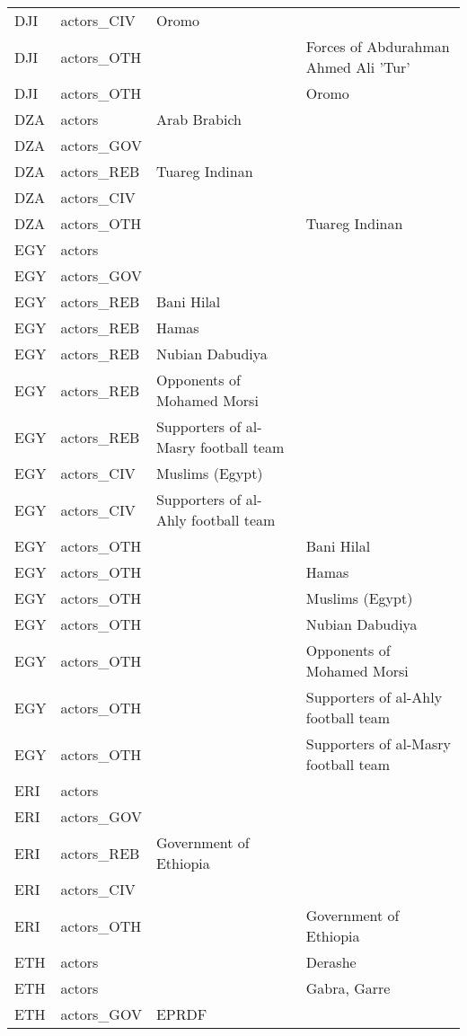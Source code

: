 \begin{table}[ht]
\begin{tabular}{llll}
  DJI & actors\_CIV & Oromo &  \\ 
  DJI & actors\_OTH &  & Forces of Abdurahman Ahmed Ali 'Tur' \\ 
  DJI & actors\_OTH &  & Oromo \\ 
  DZA & actors & Arab Brabich &  \\ 
  DZA & actors\_GOV &  &  \\ 
  DZA & actors\_REB & Tuareg Indinan &  \\ 
  DZA & actors\_CIV &  &  \\ 
  DZA & actors\_OTH &  & Tuareg Indinan \\ 
  EGY & actors &  &  \\ 
  EGY & actors\_GOV &  &  \\ 
  EGY & actors\_REB & Bani Hilal &  \\ 
  EGY & actors\_REB & Hamas &  \\ 
  EGY & actors\_REB & Nubian Dabudiya &  \\ 
  EGY & actors\_REB & Opponents of Mohamed Morsi &  \\ 
  EGY & actors\_REB & Supporters of al-Masry football team &  \\ 
  EGY & actors\_CIV & Muslims (Egypt) &  \\ 
  EGY & actors\_CIV & Supporters of al-Ahly football team &  \\ 
  EGY & actors\_OTH &  & Bani Hilal \\ 
  EGY & actors\_OTH &  & Hamas \\ 
  EGY & actors\_OTH &  & Muslims (Egypt) \\ 
  EGY & actors\_OTH &  & Nubian Dabudiya \\ 
  EGY & actors\_OTH &  & Opponents of Mohamed Morsi \\ 
  EGY & actors\_OTH &  & Supporters of al-Ahly football team \\ 
  EGY & actors\_OTH &  & Supporters of al-Masry football team \\ 
  ERI & actors &  &  \\ 
  ERI & actors\_GOV &  &  \\ 
  ERI & actors\_REB & Government of Ethiopia &  \\ 
  ERI & actors\_CIV &  &  \\ 
  ERI & actors\_OTH &  & Government of Ethiopia \\ 
  ETH & actors &  & Derashe \\ 
  ETH & actors &  & Gabra, Garre \\ 
  ETH & actors\_GOV & EPRDF &  \\ 

\end{tabular}
\end{table}
